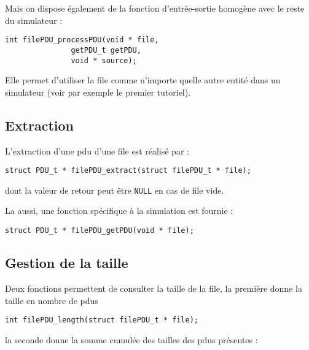    Mais on dispose également de la fonction d'entrée-sortie homogène
avec le reste du simulateur :

\begin{verbatim}
int filePDU_processPDU(void * file,
		       getPDU_t getPDU,
		       void * source);
\end{verbatim}

   Elle permet d'utiliser la file comme n'importe quelle autre entité
dans un simulateur (voir par exemple le premier tutoriel).

%
\subsection{Extraction}

   L'extraction d'une {\sc pdu} d'une file est réalisé par :

\begin{verbatim}
struct PDU_t * filePDU_extract(struct filePDU_t * file);
\end{verbatim}

   dont la valeur de retour peut être {\tt NULL} en cas de file vide.

   La aussi, une fonction spécifique à la simulation est fournie :

\begin{verbatim}
struct PDU_t * filePDU_getPDU(void * file);
\end{verbatim}

%
\subsection{Gestion de la taille}

   Deux fonctions permettent de consulter la taille de la file, la
première donne la taille en nombre de {\sc pdu}s

\begin{verbatim}
int filePDU_length(struct filePDU_t * file);
\end{verbatim}

   la seconde donne la somme cumulée des tailles des {\sc pdu}s
présentes :

